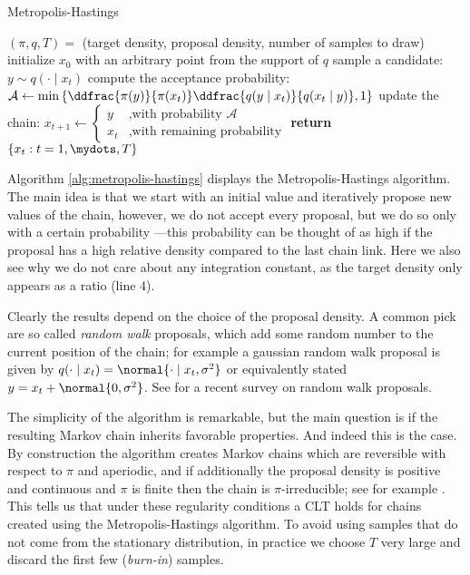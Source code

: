 \begin{algorithm}
\caption{Metropolis-Hastings}\label{alg:metropolis-hastings}
\begin{algorithmic}[1]
  \Require $(\pi, q, T) =$ (target density, proposal density, number of samples to draw)
\State initialize $x_0$ with an arbitrary point from the support of $q$
  \State sample a candidate: $y \sim q(\cdot \mid x_t)$
  \State compute the acceptance probability: $\mathcal{A} \gets \min\left\{ \ddfrac{\pi(y)}{\pi(x_t)} \ddfrac{q(y \mid x_t)}{q(x_t \mid y)}, 1\right\}$
  \State update the chain: $x_{t+1} \gets \begin{cases} y &\mbox{,with probability } \mathcal{A}\\ x_t &\mbox{,with remaining probability} \end{cases}$
\EndFor{}
\State \textbf{return} $\{x_t : t = 1,\mydots,T\}$
\end{algorithmic}
\end{algorithm}

\noindent
Algorithm \ref{alg:metropolis-hastings} displays the Metropolis-Hastings algorithm.
The main idea is that we start with an initial value and iteratively propose new values of the chain, however, we do not accept every proposal, but we do so only with a certain probability ---this probability can be thought of as high if the proposal has a high relative density compared to the last chain link.
Here we also see why we do not care about any integration constant, as the target density only appears as a ratio (line 4).

Clearly the results depend on the choice of the proposal density.
A common pick are so called \emph{random walk} proposals, which add some random number to the current position of the chain; for example a gaussian random walk proposal is given by $q(\cdot \mid x_t) = \normal{\cdot \mid x_t, \sigma^2}$ or equivalently stated $y = x_t + \normal{0, \sigma^2}$.
See \citet{sherlock2010} for a recent survey on random walk proposals.

The simplicity of the algorithm is remarkable, but the main question is if the resulting Markov chain inherits favorable properties.
And indeed this is the case.
By construction the algorithm creates Markov chains which are reversible with respect to $\pi$ and aperiodic, and if additionally the proposal density is positive and continuous and $\pi$ is finite then the chain is $\pi$-irreducible; see for example \citet{roberts2004}.
This tells us that under these regularity conditions a CLT holds for chains created using the Metropolis-Hastings algorithm.
To avoid using samples that do not come from the stationary distribution, in practice we choose $T$ very large and discard the first few (\emph{burn-in}) samples.

